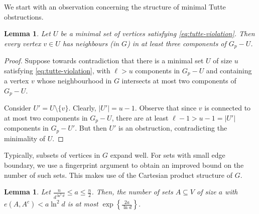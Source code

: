 \documentclass[10pt,a4paper]{article}
\newtheorem{lemma}[thm]{Lemma}
\begin{document}
We start with an observation concerning the structure of minimal Tutte obstructions.
\begin{lemma} \label{lem:three_edges}
Let $U$ be a minimal set of vertices satisfying \eqref{eq:tutte-violation}. Then every vertex $v \in U$ has neighbours (in $G$) in at least three components of $G_p-U$.
\end{lemma}
\begin{proof}
Suppose towards contradiction that there is a minimal set $U$ of size $u$ satisfying \eqref{eq:tutte-violation}, with $\ell>u$ components in $G_p-U$ and containing a vertex $v$ whose neighbourhood in $G$ intersects at most two components of $G_p-U$.

Consider $U'=U \setminus \{v\}$. Clearly, $|U'|=u-1$. Observe that since $v$ is connected to at most two components in $G_p-U$, there are at least $\ell-1>u-1=|U'|$ components in $G_p-U'$. But then $U'$ is an obstruction, contradicting the minimality of $U$.
\end{proof}

Typically, subsets of vertices in $G$ expand well. For sets with small edge boundary, we use a fingerprint argument to obtain an improved bound on the number of such sets. This makes use of the Cartesian product structure of $G$.

\begin{lemma}\label{lem:small-boundary-sets}
Let $\frac{n}{d^{\ln^2 d}}\le a\le \frac{n}{2}$. Then, the number of sets $A\subseteq V$ of size $a$ with $e(A,A^c)< a\ln^2d$ is at most $\exp\left\{\frac{2a}{\ln d}\right\}$.
\end{lemma}
\end{document}
